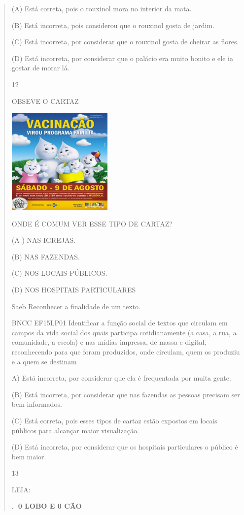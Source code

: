{{{{\begin{verse}
{{\begin{escolha}
{{{{{(A) Está correta, pois o rouxinol mora no interior da mata.

(B) Está incorreta, pois considerou que o rouxinol gosta de jardim.

(C) Está incorreta, por considerar que o rouxinol gosta de cheirar as
flores.

(D) Está incorreta, por considerar que o palácio era muito bonito e ele
ia gostar de morar lá.

\num{12}

OBSEVE O CARTAZ

\includegraphics[width=2.01806in,height=2.05069in]{media/image159.jpeg}

ONDE É COMUM VER ESSE TIPO DE CARTAZ?

(A ) NAS IGREJAS.

(B) NAS FAZENDAS.

(C) NOS LOCAIS PÚBLICOS.

(D) NOS HOSPITAIS PARTICULARES

Saeb Reconhecer a finalidade de um texto.

BNCC EF15LP01 Identificar a função social de textos que circulam em
campos da vida social dos quais participa cotidianamente (a casa, a rua,
a comunidade, a escola) e nas mídias impressa, de massa e digital,
reconhecendo para que foram produzidos, onde circulam, quem os produziu
e a quem se destinam

A) Está incorreta, por considerar que ela é frequentada por muita gente.

(B) Está incorreta, por considerar que nas fazendas as pessoas precisam
ser bem informados.

(C) Está correta, pois esses tipos de cartaz estão expostos em locais
públicos para alcançar maior visualização.

(D) Está incorreta, por considerar que os hospitais particulares o
público é bem maior.

\num{13}

LEIA:

.~\includegraphics{media/image160.png}\includegraphics{media/image160.png}\textbf{0
LOBO E 0 CÃO}

}}}}}
\end{escolha}}}
\end{verse}}}}}
